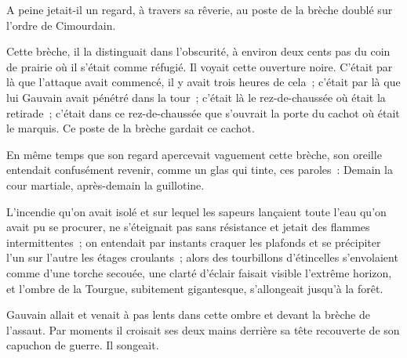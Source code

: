 \documentclass[french,twoside]{book} %
\begin{document}
A peine jetait-il un regard, à travers sa rêverie, au poste de la brèche doublé sur l’ordre de Cimourdain.\par
Cette brèche, il la distinguait dans l’obscurité, à environ deux cents pas du coin de prairie où il s’était comme réfugié. Il voyait cette ouverture noire. C’était par là que l’attaque avait commencé, il y avait trois heures de cela ; c’était par là que lui Gauvain avait pénétré dans la tour ; c’était là le rez-de-chaussée où était la retirade ; c’était dans ce rez-de-chaussée que s’ouvrait la porte du cachot où était le marquis. Ce poste de la brèche gardait ce cachot.\par
En même temps que son regard apercevait vaguement cette brèche, son oreille entendait confusément revenir, comme un glas qui tinte, ces paroles : Demain la cour martiale, après-demain la guillotine.\par
L’incendie qu’on avait isolé et sur lequel les sapeurs lançaient toute l’eau qu’on avait pu se procurer, ne s’éteignait pas sans résistance et jetait des flammes  intermittentes ; on entendait par instants craquer les plafonds et se précipiter l’un sur l’autre les étages croulants ; alors des tourbillons d’étincelles s’envolaient comme d’une torche secouée, une clarté d’éclair faisait visible l’extrême horizon, et l’ombre de la Tourgue, subitement gigantesque, s’allongeait jusqu’à la forêt.\par
Gauvain allait et venait à pas lents dans cette ombre et devant la brèche de l’assaut. Par moments il croisait ses deux mains derrière sa tête recouverte de son capuchon de guerre. Il songeait.
\end{document}
